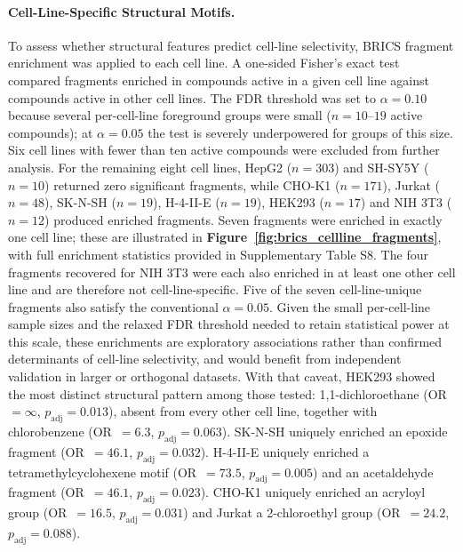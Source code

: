 \documentclass[letterpaper]{article}
\begin{document}
\paragraph{Cell-Line-Specific Structural Motifs.}
To assess whether structural features predict cell-line selectivity, BRICS fragment enrichment was applied to each cell line. A one-sided Fisher's exact test compared fragments enriched in compounds active in a given cell line against compounds active in other cell lines. The FDR threshold was set to $\alpha = 0.10$ because several per-cell-line foreground groups were small ($n = 10$--$19$ active compounds); at $\alpha = 0.05$ the test is severely underpowered for groups of this size. Six cell lines with fewer than ten active compounds were excluded from further analysis. For the remaining eight cell lines, HepG2 ($n = 303$) and SH-SY5Y ($n = 10$) returned zero significant fragments, while CHO-K1 ($n = 171$), Jurkat ($n = 48$), SK-N-SH ($n = 19$), H-4-II-E ($n = 19$), HEK293 ($n = 17$) and NIH 3T3 ($n = 12$) produced enriched fragments. Seven fragments were enriched in exactly one cell line; these are illustrated in \textbf{Figure~\ref{fig:brics_cellline_fragments}}, with full enrichment statistics provided in Supplementary Table S8. The four fragments recovered for NIH 3T3 were each also enriched in at least one other cell line and are therefore not cell-line-specific. Five of the seven cell-line-unique fragments also satisfy the conventional $\alpha = 0.05$. Given the small per-cell-line sample sizes and the relaxed FDR threshold needed to retain statistical power at this scale, these enrichments are exploratory associations rather than confirmed determinants of cell-line selectivity, and would benefit from independent validation in larger or orthogonal datasets. With that caveat, HEK293 showed the most distinct structural pattern among those tested: 1,1-dichloroethane (OR~$= \infty$, $p_{\text{adj}} = 0.013$), absent from every other cell line, together with chlorobenzene (OR~$= 6.3$, $p_{\text{adj}} = 0.063$). SK-N-SH uniquely enriched an epoxide fragment (OR~$= 46.1$, $p_{\text{adj}} = 0.032$). H-4-II-E uniquely enriched a tetramethylcyclohexene motif (OR~$= 73.5$, $p_{\text{adj}} = 0.005$) and an acetaldehyde fragment (OR~$= 46.1$, $p_{\text{adj}} = 0.023$). CHO-K1 uniquely enriched an acryloyl group (OR~$= 16.5$, $p_{\text{adj}} = 0.031$) and Jurkat a 2-chloroethyl group (OR~$= 24.2$, $p_{\text{adj}} = 0.088$).
\end{document}
